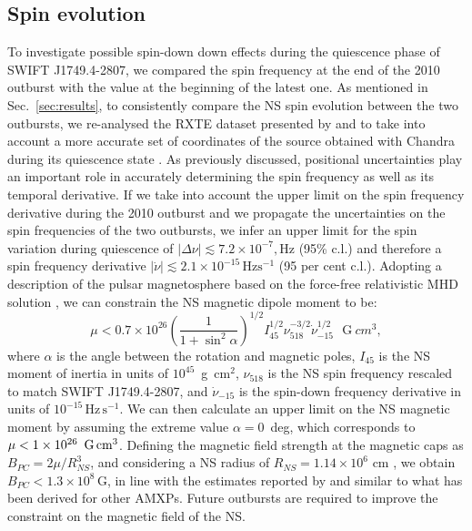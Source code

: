 \documentclass[fleqn,usenatbib]{mnras}
\newcommand{\swiftj}{SWIFT J1749.4-2807}
\newcommand{\rxte}{RXTE}
\newcommand{\chandra}{Chandra}
\begin{document}
\subsection{Spin evolution}
\label{sec:spinevo}
To investigate possible spin-down down effects during the quiescence phase of \swiftj{}, we compared the spin frequency at the end of the 2010 outburst with the value at the beginning of the latest one. As mentioned in Sec.~\ref{sec:results}, to consistently compare the NS spin evolution between the two outbursts, we re-analysed the \rxte{} dataset presented by \citet{Markwardt:2010tl} and \citet{Altamirano:2011uq} to take into account a more accurate set of coordinates of the source obtained with \chandra{} during its quiescence state \citep{Jonker:2013wp}. As previously discussed, positional uncertainties play an important role in accurately determining the spin frequency as well as its temporal derivative. 
If we take into account the upper limit on the spin frequency derivative during the 2010 outburst and we propagate the uncertainties on the spin frequencies of the two outbursts, we infer an upper limit for the spin variation during quiescence of $|\Delta \nu|\lesssim7.2\times 10^{-7}, \text{Hz}$ (95\% c.l.) and therefore a spin frequency derivative $|\dot{\nu}|\lesssim 2.1\times 10^{-15}\, \text{Hz}\text{s}^{-1}$ (95 per cent c.l.).
Adopting a description of the pulsar magnetosphere based on the force-free relativistic MHD solution \citet{Spitkovsky:2006uz}, we can constrain the NS magnetic dipole moment to be:
\begin{equation}
\mu < 0.7\times10^{26}\left(\frac{1}{1+\sin^2{\alpha}}\right)^{1/2} I_{45}^{1/2}\nu_{518}^{-3/2}\dot{\nu}_{-15}^{1/2}\,\,\,\, \text{G}~{cm}^3,
\label{eq:mag}
\end{equation}
where $\alpha$ is the angle between the rotation and magnetic poles, $I_{45}$ is the NS moment of inertia in units of $10^{45}$~g~cm$^2$, $\nu_{518}$ is the NS spin frequency rescaled to match \swiftj{}, and $\dot{\nu}_{-15}$ is the spin-down frequency derivative in units of $10^{-15}\,\text{Hz}\,\text{s}^{-1}$. We can then calculate an upper limit on the NS magnetic moment by assuming the extreme value $\alpha=0$~deg, which corresponds to $\mu < 1\times10^{26}\,\,\, \textrm{G\,cm$^3$}$.
Defining the magnetic field strength at the magnetic caps as $B_{PC}= 2 \mu/R_{NS}^{3}$, and considering a NS radius of $R_{NS}=1.14\times10^{6}$ cm  \citep[corresponding to the FPS equation of state for a 1.4~M$_\odot{}$ NS, see e.g.,][]{Friedman1981a, Pandharipande1989a}, we obtain $B_{PC}<1.3\times 10^{8}\,\text{G}$, in line with the estimates reported by \citet{Mukherjee:2015td} and similar to what has been derived for other AMXPs. Future outbursts are required to improve the constraint on the magnetic field of the NS. 
\end{document}
